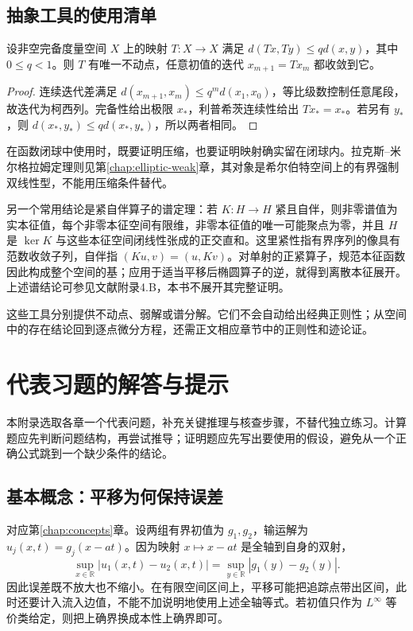\documentclass[UTF8,12pt,a4paper,fontset=fandol]{ctexbook}
\begin{document}
\section{抽象工具的使用清单}
\begin{theorem}
设非空完备度量空间 $X$ 上的映射 $T:X\to X$ 满足 $d(Tx,Ty)\le qd(x,y)$，其中 $0\le q<1$。则 $T$ 有唯一不动点，任意初值的迭代 $x_{m+1}=Tx_m$ 都收敛到它。
\end{theorem}
\begin{proof}
连续迭代差满足 $d(x_{m+1},x_m)\le q^m d(x_1,x_0)$，等比级数控制任意尾段，故迭代为柯西列。完备性给出极限 $x_*$，利普希茨连续性给出 $Tx_*=x_*$。若另有 $y_*$，则 $d(x_*,y_*)\le qd(x_*,y_*)$，所以两者相同。
\end{proof}
在函数闭球中使用时，既要证明压缩，也要证明映射确实留在闭球内。拉克斯--米尔格拉姆定理则见第\ref{chap:elliptic-weak}章，其对象是希尔伯特空间上的有界强制双线性型，不能用压缩条件替代。

另一个常用结论是紧自伴算子的谱定理：若 $K:H\to H$ 紧且自伴，则非零谱值为实本征值，每个非零本征空间有限维，非零本征值的唯一可能聚点为零，并且 $H$ 是 $\ker K$ 与这些本征空间闭线性张成的正交直和。这里紧性指有界序列的像具有范数收敛子列，自伴指 $(Ku,v)=(u,Kv)$。对单射的正紧算子，规范本征函数因此构成整个空间的基；应用于适当平移后椭圆算子的逆，就得到离散本征展开。上述谱结论可参见文献\cite{hunter}附录4.B，本书不展开其完整证明。

这些工具分别提供不动点、弱解或谱分解。它们不会自动给出经典正则性；从空间中的存在结论回到逐点微分方程，还需正文相应章节中的正则性和迹论证。

\chapter{代表习题的解答与提示}
\label{app:worked-exercises}

本附录选取各章一个代表问题，补充关键推理与核查步骤，不替代独立练习。计算题应先判断问题结构，再尝试推导；证明题应先写出要使用的假设，避免从一个正确公式跳到一个缺少条件的结论。

\section{基本概念：平移为何保持误差}
对应第\ref{chap:concepts}章。设两组有界初值为 $g_1,g_2$，输运解为 $u_j(x,t)=g_j(x-at)$。因为映射 $x\mapsto x-at$ 是全轴到自身的双射，
\[
 \sup_{x\in\mathbb R}|u_1(x,t)-u_2(x,t)|
 =\sup_{y\in\mathbb R}|g_1(y)-g_2(y)|.
\]
因此误差既不放大也不缩小。在有限空间区间上，平移可能把追踪点带出区间，此时还要计入流入边值，不能不加说明地使用上述全轴等式。若初值只作为 $L^\infty$ 等价类给定，则把上确界换成本性上确界即可。
\end{document}
